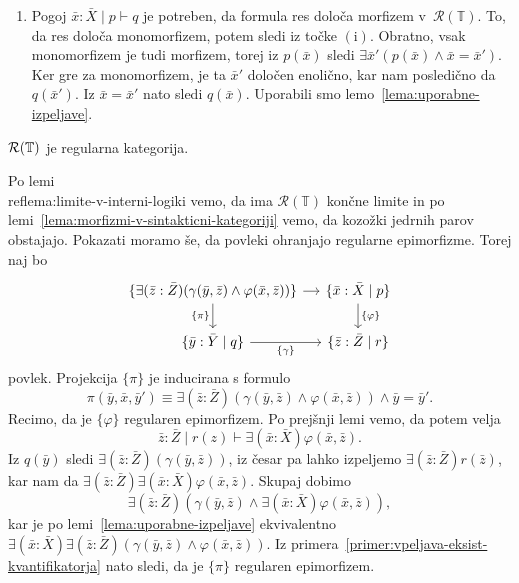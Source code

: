\documentclass[../kategoricna_logika.tex]{subfiles}
\begin{document}
\begin{dokaz}
\begin{enumerate}[label=(\roman*)]
  \item Pogoj $\bar{x}:\bar{X} \mid p \vdash q$
    je potreben, da formula res določa morfizem
    v~$\mathcal{R}(\mathbb{T})$.  To, da res določa monomorfizem,
    potem sledi iz točke $(\mathrm{i})$. Obratno, vsak monomorfizem je
    tudi morfizem, torej iz $p(\bar{x})$ sledi $\exists \bar{x}'( p(\bar{x}) \land
    \bar{x}=\bar{x}')$. Ker gre za monomorfizem, je ta $\bar{x}'$ določen enolično, kar
    nam posledično da $q(\bar{x}')$. Iz $\bar{x} = \bar{x}'$ nato sledi
    $q(\bar{x})$. Uporabili smo lemo~\ref{lema:uporabne-izpeljave}.\qedhere
  \end{enumerate}
\end{dokaz}
\begin{trditev}
  $\mathcal{R}(\mathbb{T})$ je regularna kategorija.
\end{trditev}
\begin{dokaz}
  Po lemi\\ref{lema:limite-v-interni-logiki} vemo, da ima
  $\mathcal{R}(\mathbb{T})$ končne limite in po lemi~\ref{lema:morfizmi-v-sintakticni-kategoriji} vemo,
  da kozožki
  jedrnih parov obstajajo. Pokazati moramo še, da povleki ohranjajo
  regularne epimorfizme.  Torej naj bo
  \begin{equation*}
    \begin{tikzcd}[column sep=small]
      \{\exists (\bar{z}:\bar{Z})(\gamma(\bar{y},\bar{z}) \land \varphi(\bar{x},\bar{z}))\} \ar[d, "{\{ \pi\}}"'] \ar[r] &
      \{ \bar{x}:\bar{X} \mid p\} \ar[d, "{\{\varphi\}}"] \\
      \{\bar{y}:\bar{Y} \mid q\} \ar[r, "{\{\gamma\}}"'] & \{\bar{z}:\bar{Z} \mid r\}
    \end{tikzcd}
  \end{equation*}
  povlek. Projekcija $\{ \pi\}$
  je inducirana s formulo
  \[ \pi(\bar{y},\bar{x},\bar{y}') \equiv \exists (\bar{z}:\bar{Z})(\gamma(\bar{y},\bar{z}) \land \varphi(\bar{x},\bar{z}))\land \bar{y}=\bar{y}'.\]
  Recimo, da je $\{\varphi\}$ regularen
  epimorfizem. Po prejšnji lemi vemo, da potem velja
  $$\bar{z}:\bar{Z} \mid r(z) \vdash \exists (\bar{x}:\bar{X} ) \varphi(\bar{x},\bar{z}).$$
  Iz
  $q(\bar{y})$ sledi $\exists (\bar{z}:\bar{Z})(\gamma(\bar{y},\bar{z}))$, iz česar pa lahko izpeljemo
  $\exists (\bar{z}:\bar{Z}) r(\bar{z})$, kar nam da $\exists (\bar{z}:\bar{Z}) \exists (\bar{x}:\bar{X} )
  \varphi(\bar{x},\bar{z})$. Skupaj dobimo
  \[ \exists (\bar{z}:\bar{Z})(\gamma(\bar{y},\bar{z}) \land \exists (\bar{x}:\bar{X} ) \varphi(\bar{x},\bar{z})),\]
  kar je po lemi~\ref{lema:uporabne-izpeljave} ekvivalentno
  $\exists (\bar{x}:\bar{X} ) \exists (\bar{z}:\bar{Z})(\gamma(\bar{y},\bar{z}) \land \varphi(\bar{x},\bar{z}))$.
  Iz primera~\ref{primer:vpeljava-eksist-kvantifikatorja} nato sledi, da je
  $\{\pi\}$ regularen epimorfizem.
\end{dokaz}
\end{document}
